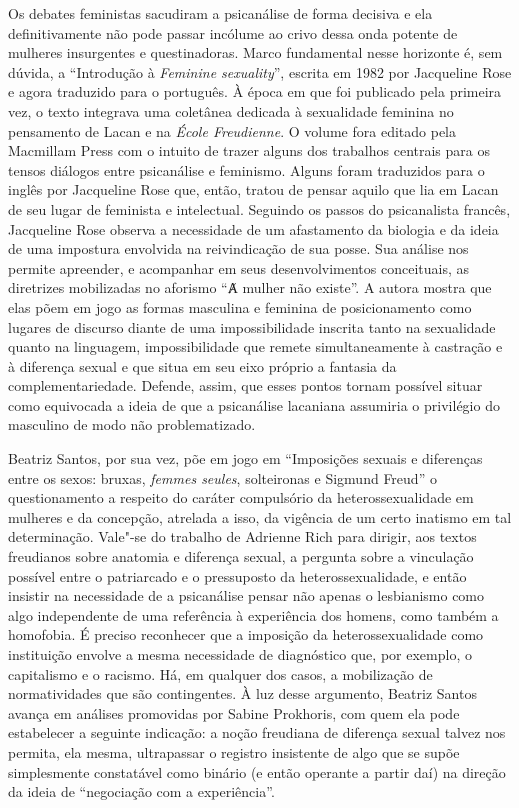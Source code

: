 Os debates feministas sacudiram a psicanálise de forma decisiva e ela
definitivamente não pode passar incólume ao crivo dessa onda potente de
mulheres insurgentes e questinadoras. Marco fundamental nesse horizonte
é, sem dúvida, a ``Introdução  à \emph{Feminine sexuality}'', escrita em 1982
por Jacqueline Rose e agora traduzido para o português. À época em que
foi publicado pela primeira vez, o texto integrava uma coletânea
dedicada à sexualidade feminina no pensamento de Lacan e na \emph{École
Freudienne}. O volume fora editado pela Macmillam Press com o intuito de
trazer alguns dos trabalhos centrais para os tensos diálogos entre
psicanálise e feminismo. Alguns foram traduzidos para o inglês por
Jacqueline Rose que, então, tratou de pensar aquilo que lia em Lacan
de seu lugar de feminista e intelectual. Seguindo os passos do
psicanalista francês, Jacqueline Rose observa a necessidade de um
afastamento da biologia e da ideia de uma impostura envolvida na
reivindicação de sua posse. Sua análise nos permite apreender, e
acompanhar em seus desenvolvimentos conceituais, as diretrizes
mobilizadas no aforismo ``Ⱥ mulher não existe''. A autora mostra que
elas põem em jogo as formas masculina e feminina de posicionamento como
lugares de discurso diante de uma impossibilidade inscrita tanto na
sexualidade quanto na linguagem, impossibilidade que remete
simultaneamente à castração e à diferença sexual e que situa em seu eixo
próprio a fantasia da complementariedade. Defende, assim, que esses
pontos tornam possível situar como equivocada a ideia de que a
psicanálise lacaniana assumiria o privilégio do masculino de modo não
problematizado.

Beatriz Santos, por sua vez, põe em jogo em ``Imposições sexuais e
diferenças entre os sexos: bruxas, \emph{femmes seules}, solteironas e
Sigmund Freud'' o questionamento a respeito do caráter compulsório da
heterossexualidade em mulheres e da concepção, atrelada a isso, da
vigência de um certo inatismo em tal determinação. Vale"-se do trabalho
de Adrienne Rich para dirigir, aos textos freudianos sobre anatomia e
diferença sexual, a pergunta sobre a vinculação possível entre o
patriarcado e o pressuposto da heterossexualidade, e então insistir na
necessidade de a psicanálise pensar não apenas o lesbianismo como algo
independente de uma referência à experiência dos homens, como também a
homofobia. É preciso reconhecer que a imposição da heterossexualidade
como instituição envolve a mesma necessidade de diagnóstico que, por
exemplo, o capitalismo e o racismo. Há, em qualquer dos casos, a
mobilização de normatividades que são contingentes. À luz desse
argumento, Beatriz Santos avança em análises promovidas por Sabine
Prokhoris, com quem ela pode estabelecer a seguinte indicação: a noção
freudiana de diferença sexual talvez nos permita, ela mesma, ultrapassar
o registro insistente de algo que se supõe simplesmente constatável como
binário (e então operante a partir daí) na direção da ideia de
``negociação com a experiência''.

